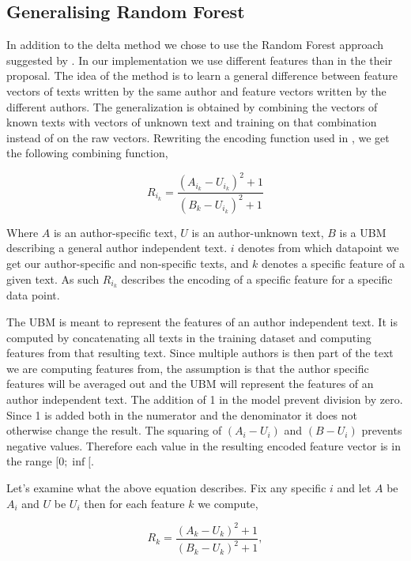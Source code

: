 \subsection{Generalising Random Forest} \label{subsec:Generalising Random Forest}
In addition to the delta method we chose to use the Random Forest approach
suggested by \cite{pacheco2015}. In our implementation we use different features
than in the their proposal. The idea of the method is to learn a general
difference between feature vectors of texts written by the same author and
feature vectors written by the different authors. The generalization is obtained
by combining the vectors of known texts with vectors of unknown text and
training on that combination instead of on the raw vectors. Rewriting the
encoding function used in \cite{pacheco2015}, we get the following combining
function,

\begin{equation}
        R_{i_k} = \frac{(A_{i_k}-U_{i_k})^2+1}{(B_k-U_{i_k})^2+1}
\end{equation}

Where $A$ is an author-specific text, $U$ is an author-unknown text, $B$ is a \gls{UBM}
describing a general author independent text. $i$ denotes from which datapoint we get our author-specific and non-specific texts, and $k$ denotes a specific feature of a given text. As such $R_{i_k}$ describes the encoding of a specific feature for a specific data point.

The \gls{UBM} is meant to represent the features of an author independent text.
It is computed by concatenating all texts in the training dataset and computing
features from that resulting text. Since multiple authors is then part of the
text we are computing features from, the assumption is that the author specific
features will be averaged out and the \gls{UBM} will represent the features of
an author independent text. The addition of 1 in the model prevent division
by zero. Since 1 is added both in the numerator and the denominator it does
not otherwise change the result. The squaring of $(A_i - U_i)$ and $(B - U_i)$
prevents negative values. Therefore each value in the resulting encoded feature
vector is in the range $[0; \inf[$.

Let's examine what the above equation describes. Fix any specific $i$ and let
$A$ be $A_i$ and $U$ be $U_i$ then for each feature $k$ we compute,

\begin{equation}
\label{eq:rf-encode}
    R_k = \frac{(A_k-U_k)^2+1}{(B_k-U_k)^2+1},
\end{equation}

